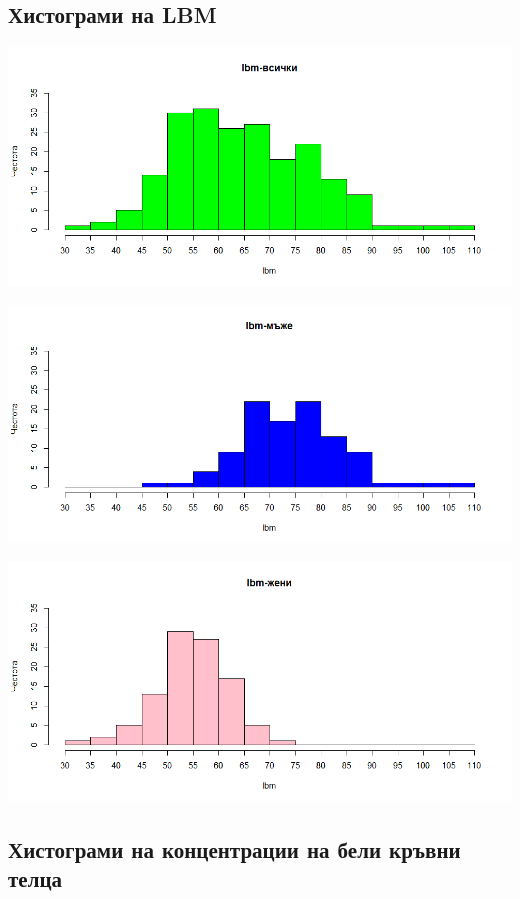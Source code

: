 \documentclass[12pt]{article}
\begin{document}
\begin{large}
\subsection{Хистограми на LBM}

\includegraphics[width=\textwidth,height=\textheight,keepaspectratio]{pics/lbmall}

\includegraphics[width=\textwidth,height=\textheight,keepaspectratio]{pics/lbmmen}

\includegraphics[width=\textwidth,height=\textheight,keepaspectratio]{pics/lbmwomen}


\subsection{Хистограми на концентрации на бели кръвни телца}


\end{large}
\end{document}
